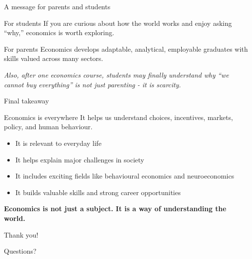 \documentclass[aspectratio=169,11pt]{beamer}
\begin{document}
\begin{frame}{A message for parents and students}
\begin{block}{For students}
If you are curious about how the world works and enjoy asking ``why,'' economics is worth exploring.
\end{block}
\vspace{0.3cm}
\begin{block}{For parents}
Economics develops adaptable, analytical, employable graduates with skills valued across many sectors.
\end{block}
\vspace{0.4cm}
\textit{Also, after one economics course, students may finally understand why ``we cannot buy everything'' is not just parenting - it is scarcity.}
\end{frame}

\begin{frame}{Final takeaway}
\begin{block}{Economics is everywhere}
It helps us understand choices, incentives, markets, policy, and human behaviour.
\end{block}
\vspace{0.4cm}
\begin{itemize}
    \item It is relevant to everyday life
    \item It helps explain major challenges in society
    \item It includes exciting fields like behavioural economics and neuroeconomics
    \item It builds valuable skills and strong career opportunities
\end{itemize}
\vspace{0.5cm}
\centering
\Large \textbf{Economics is not just a subject. It is a way of understanding the world.}
\end{frame}

\begin{frame}[plain]
\centering
\vfill
{\Huge Thank you!}\par
\vspace{0.3cm}
Questions?
\vfill
{}
\end{frame}
\end{document}
